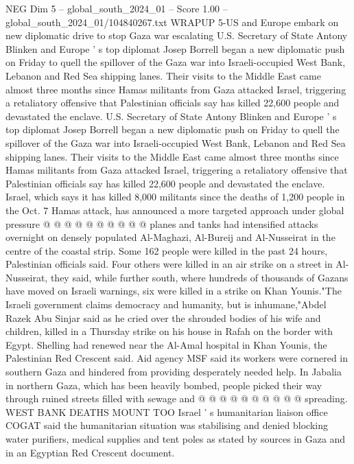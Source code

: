\begin{textsample}{NEG Dim 5 – global\_south\_2024\_01 – Score 1.00 – global\_south\_2024\_01/104840267.txt}  \label{ex:f5_neg_440}
WRAPUP 5-US and Europe embark on new diplomatic drive to stop Gaza war escalating U.S.
Secretary of State Antony Blinken and Europe ' s top diplomat Josep Borrell began a new diplomatic push on Friday to quell the spillover of the Gaza war into Israeli-occupied West Bank, Lebanon and Red Sea shipping lanes.
Their visits to the Middle East came almost three months since Hamas militants from Gaza attacked Israel, triggering a retaliatory offensive that Palestinian officials say has killed 22,600 people and devastated the enclave.
U.S.
Secretary of State Antony Blinken and Europe ' s top diplomat Josep Borrell began a new diplomatic push on Friday to quell the spillover of the Gaza war into Israeli-occupied West Bank, Lebanon and Red Sea shipping lanes.
Their visits to the Middle East came almost three months since Hamas militants from Gaza attacked Israel, triggering a retaliatory offensive that Palestinian officials say has killed 22,600 people and devastated the enclave.
Israel, which says it has killed 8,000 militants since the deaths of 1,200 people in the Oct. 7 Hamas attack, has announced a more targeted approach under global pressure @ @ @ @ @ @ @ @ @ @ planes and tanks had intensified attacks overnight on densely populated Al-Maghazi, Al-Bureij and Al-Nusseirat in the centre of the coastal strip.
Some 162 people were killed in the past 24 hours, Palestinian officials said.
Four others were killed in an air strike on a street in Al-Nusseirat, they said, while further south, where hundreds of thousands of Gazans have moved on Israeli warnings, six were killed in a strike on Khan Younis."The Israeli government claims democracy and humanity, but is inhumane,"Abdel Razek Abu Sinjar said as he cried over the shrouded bodies of his wife and children, killed in a Thursday strike on his house in Rafah on the border with Egypt.
Shelling had renewed near the Al-Amal hospital in Khan Younis, the Palestinian Red Crescent said.
Aid agency MSF said its workers were cornered in southern Gaza and hindered from providing desperately needed help.
In Jabalia in northern Gaza, which has been heavily bombed, people picked their way through ruined streets filled with sewage and @ @ @ @ @ @ @ @ @ @ spreading.
WEST BANK DEATHS MOUNT TOO Israel ' s humanitarian liaison office COGAT said the humanitarian situation was stabilising and denied blocking water purifiers, medical supplies and tent poles as stated by sources in Gaza and in an Egyptian Red Crescent document.

\end{textsample}
